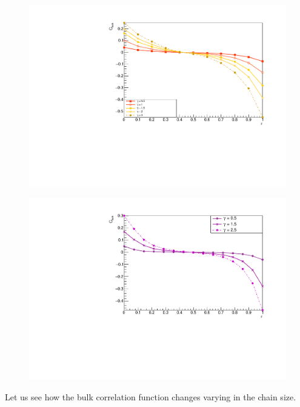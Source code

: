 \begin{figure}[H]
    \centering
    \includegraphics[scale=0.7]{Figures/12sites/12sites_CFBulkVSgamma.pdf}
    \caption{}
    \label{fig:my_label}
\end{figure}

\begin{figure}[H]
    \centering
    \includegraphics[scale=0.7]{Figures/16sites/16sites_CFBulkVSgamma.pdf}
    \caption{}
    \label{fig:my_label}
\end{figure}

Let us see how the bulk correlation function changes varying in the chain size.


